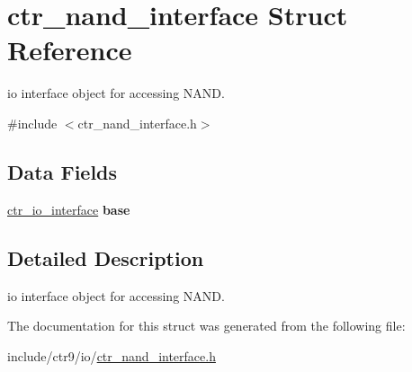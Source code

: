 \hypertarget{structctr__nand__interface}{}\section{ctr\+\_\+nand\+\_\+interface Struct Reference}
\label{structctr__nand__interface}


io interface object for accessing N\+A\+ND.  




{\ttfamily \#include $<$ctr\+\_\+nand\+\_\+interface.\+h$>$}

\subsection*{Data Fields}
\begin{DoxyCompactItemize}
\item 
\hyperlink{structctr__io__interface}{ctr\+\_\+io\+\_\+interface} {\bfseries base}\hypertarget{structctr__nand__interface_a7290ed51345872060525576353001671}{}\label{structctr__nand__interface_a7290ed51345872060525576353001671}

\end{DoxyCompactItemize}


\subsection{Detailed Description}
io interface object for accessing N\+A\+ND. 

The documentation for this struct was generated from the following file\+:\begin{DoxyCompactItemize}
\item 
include/ctr9/io/\hyperlink{ctr__nand__interface_8h}{ctr\+\_\+nand\+\_\+interface.\+h}\end{DoxyCompactItemize}
